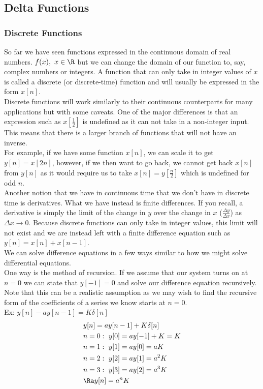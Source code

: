 \subsection{Delta Functions}
\subsubsection{Discrete Functions}
So far we have seen functions expressed in the continuous domain of real numbers. $f(x),\ x\in\R$ but we can change the domain of our function to, say, complex numbers or integers. A function that can only take in integer values of $x$ is called a discrete (or discrete-time) function and will usually be expressed in the form $x[n]$.\\
Discrete functions will work similarly to their continuous counterparts for many applications but with some caveats. One of the major differences is that an expression such as $x[\frac{1}{2}]$ is undefined as it can not take in a non-integer input.\\
This means that there is a larger branch of functions that will not have an inverse.\\
For example, if we have some function $x[n]$, we can scale it to get $y[n]=x[2n]$, however, if we then want to go back, we cannot get back $x[n]$ from $y[n]$ as it would require us to take $x[n]=y[\frac{n}{2}]$ which is undefined for odd $n$.\\
Another notion that we have in continuous time that we don't have in discrete time is derivatives. What we have instead is finite differences. If you recall, a derivative is simply the limit of the change in $y$ over the change in $x$ ($\frac{\Delta y}{\Delta x}$) as $\Delta x\to0$. Because discrete functions can only take in integer values, this limit will not exist and we are instead left with a finite difference equation such as $y[n]=x[n]+x[n-1]$.\\

We can solve difference equations in a few ways similar to how we might solve differential equations.\\
One way is the method of recursion. If we assume that our system turns on at $n=0$ we can state that $y[-1]=0$ and solve our difference equation recursively. Note that this can be a realistic assumption as we may wish to find the recursive form of the coefficients of a series we know starts at $n=0$.\\
Ex: $y[n]-ay[n-1]=K\delta[n]$
\begin{align*}
    &y[n]=ay[n-1]+K\delta[n]\\
    &n=0:\ y[0]=ay[-1]+K=K\\
    &n=1:\ y[1]=ay[0]=aK\\
    &n=2:\ y[2]=ay[1]=a^2K\\
    &n=3:\ y[3]=ay[2]=a^3K\\
    &\Ra y[n]=a^nK
\end{align*}

